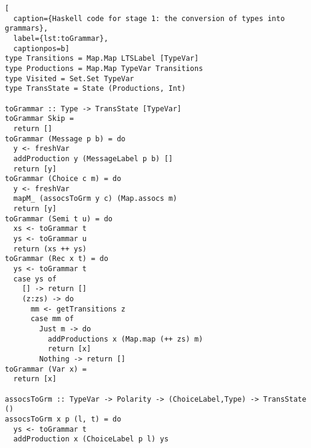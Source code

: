 \begin{lstlisting}[
  caption={Haskell code for stage 1: the conversion of types into grammars},
  label={lst:toGrammar},
  captionpos=b]
type Transitions = Map.Map LTSLabel [TypeVar]
type Productions = Map.Map TypeVar Transitions
type Visited = Set.Set TypeVar
type TransState = State (Productions, Int)

toGrammar :: Type -> TransState [TypeVar]
toGrammar Skip =
  return []
toGrammar (Message p b) = do
  y <- freshVar
  addProduction y (MessageLabel p b) []
  return [y]
toGrammar (Choice c m) = do
  y <- freshVar
  mapM_ (assocsToGrm y c) (Map.assocs m)
  return [y]
toGrammar (Semi t u) = do
  xs <- toGrammar t
  ys <- toGrammar u
  return (xs ++ ys)
toGrammar (Rec x t) = do
  ys <- toGrammar t
  case ys of
    [] -> return []
    (z:zs) -> do
      mm <- getTransitions z
      case mm of
        Just m -> do
          addProductions x (Map.map (++ zs) m)
          return [x]
        Nothing -> return []
toGrammar (Var x) =
  return [x]

assocsToGrm :: TypeVar -> Polarity -> (ChoiceLabel,Type) -> TransState ()
assocsToGrm x p (l, t) = do
  ys <- toGrammar t
  addProduction x (ChoiceLabel p l) ys
\end{lstlisting}


